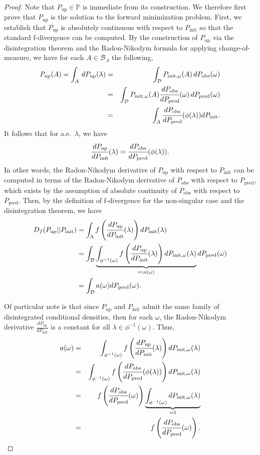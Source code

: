 \documentclass[10pt,a4paper]{amsart}
\newcommand{\B}{\mathcal{B}}
\newcommand{\dspace}{\mathcal{D}}
\newcommand{\initmeasomega}{P_{\text{init}, \omega}}
\newcommand{\initmeas}{P_{\text{init}}}
\newcommand{\obsmeas}{P_{\text{obs}}}
\newcommand{\predictmeas}{P_\text{pred}}
\newcommand{\p}{\mathbb{P}}
\newcommand{\updatemeas}{P_{\text{up}}}
\begin{document}
\begin{proof}
Note that $\updatemeas\in\p$ is immediate from its construction. 
We therefore first prove that $\updatemeas$ is the solution to the forward minimization problem.
First, we establish that $\updatemeas$ is absolutely continuous with respect to $\initmeas$ so that the standard f-divergence can be computed. 
By the construction of $\updatemeas$ via the disintegration theorem and the Radon-Nikodym formula for applying change-of-measure, we have for each $A\in \B_\Lambda$ the following, 
\begin{eqnarray*}
    \updatemeas(A) =\int_A \, d\updatemeas(\lambda) &=& \int_\dspace \initmeasomega(A) \, d\obsmeas(\omega)\\
                &=&\int_{\dspace} \initmeasomega(A) \cfrac{d\obsmeas}{d\predictmeas}(\omega)\, d\predictmeas(\omega) \\
                &=&\int_A  \cfrac{d\obsmeas}{d\predictmeas}(\phi(\lambda)) dP_\text{init}.
\end{eqnarray*}
It follows that for a.e.~$\lambda$, we have
\[
    \cfrac{d\updatemeas}{d\initmeas}(\lambda) = \cfrac{d\obsmeas}{d\predictmeas}(\phi(\lambda)).
\]
In other words, the Radon-Nikodym derivative of $\updatemeas$ with respect to $P_\text{init}$ can be computed in terms of the Radon-Nikodym derivative of $\obsmeas$ with respect to $\predictmeas$, which exists by the assumption of absolute continuity of $\obsmeas$ with respect to $\predictmeas$. 
Then, by the definition of f-divergence for the non-singular case and the disintegration theorem, we have
\begin{align}\label{eq:Aint}
    D_{f}(\updatemeas || \initmeas) &=  \int_{\Lambda} f\left(\cfrac{d\updatemeas}{d\initmeas}(\lambda)\right) d\initmeas(\lambda) \nonumber \\
    &= \int_{\mathcal{D}} \underbrace{\int_{\phi^{-1}(\omega)} f\left(\cfrac{d\updatemeas}{d\initmeas}(\lambda)\right) d\initmeasomega(\lambda)}_{=: a(\omega)} d\predictmeas(\omega) \\ 
    &= \int_{\mathcal{D}} a(\omega) d\predictmeas(\omega) \nonumber.
\end{align}

Of particular note is that since $\updatemeas$ and $P_\text{init}$ admit the same family of disintegrated conditional densities, then for each $\omega$, the Radon-Nikodym derivative $\frac{d\updatemeas}{d\initmeas}$ is a constant for all $\lambda\in\phi^{-1}(\omega)$.
Thus,
\begin{eqnarray*}
    a(\omega) &=& \int_{\phi^{-1}(\omega)} f\left(\cfrac{d\updatemeas}{d\initmeas}(\lambda)\right) d\initmeasomega(\lambda) \\
            &=& \int_{\phi^{-1}(\omega)} f\left(\cfrac{d\obsmeas}{d\predictmeas}(\phi(\lambda))\right) d\initmeasomega(\lambda)  \\
            &=& f\left(\cfrac{d\obsmeas}{d\predictmeas}(\omega)\right) \underbrace{\int_{\phi^{-1}(\omega)} d\initmeasomega(\lambda)}_{=1}\\
            &=& f\left(\cfrac{d\obsmeas}{d\predictmeas}(\omega)\right).
\end{eqnarray*}


\end{proof}
\end{document}
